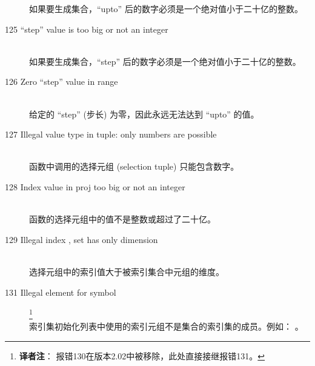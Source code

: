 \begin{description}
  如果要生成集合，``upto'' 后的数字必须是一个绝对值小于二十亿的整数。
\item[125 ``step'' value \code{xxx} is too big or not an integer]\ \\
  如果要生成集合，``step'' 后的数字必须是一个绝对值小于二十亿的整数。
\item[126 Zero ``step'' value in range]\ \\
  给定的 ``step'' (步长) 为零，因此永远无法达到 ``upto'' 的值。
\item[127 Illegal value type in tuple: \code{xxx} only numbers are
  possible]\ \\
  函数中调用的选择元组 (selection tuple) 只能包含数字。
\item[128 Index value \code{xxx} in proj too big or not an integer]\ \\
  函数的选择元组中的值不是整数或超过了二十亿。
\item[129 Illegal index \code{xxx}, set has only dimension \code{yyy}]\ \\
  选择元组中的索引值大于被索引集合中元组的维度。
\item[131 Illegal element \code{xxx} for symbol]\footnote{\textbf{译者注}：
    报错130在版本2.02中被移除，此处直接接继报错131。
  }\ \\
  索引集初始化列表中使用的索引元组不是集合的索引集的成员。例如：
  。

\end{description}
